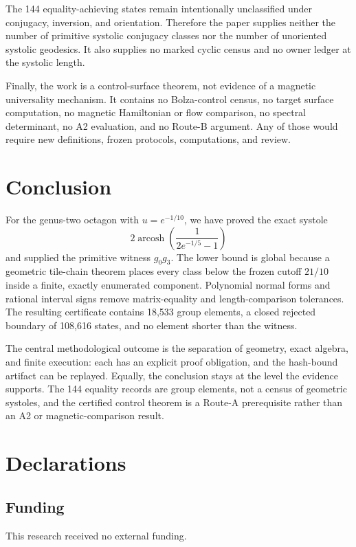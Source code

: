 \documentclass[11pt,a4paper]{article}
\theoremstyle{definition}
\newcommand{\arcosh}{\operatorname{arcosh}}
\begin{document}
The 144 equality-achieving states remain intentionally unclassified under
conjugacy, inversion, and orientation.  Therefore the paper supplies neither
the number of primitive systolic conjugacy classes nor the number of
unoriented systolic geodesics.  It also supplies no marked cyclic census and
no owner ledger at the systolic length.

Finally, the work is a control-surface theorem, not evidence of a magnetic
universality mechanism.  It contains no Bolza-control census, no target
surface computation, no magnetic Hamiltonian or flow comparison, no spectral
determinant, no A2 evaluation, and no Route-B argument.  Any of those would
require new definitions, frozen protocols, computations, and review.

\section{Conclusion}

For the genus-two octagon with \(u=e^{-1/10}\), we have proved the exact
systole
\[
 2\arcosh\!\left(\frac{1}{2e^{-1/5}-1}\right)
\]
and supplied the primitive witness \(g_0g_3\).  The lower bound is global
because a geometric tile-chain theorem places every class below the frozen
cutoff \(21/10\) inside a finite, exactly enumerated component.  Polynomial
normal forms and rational interval signs remove matrix-equality and
length-comparison tolerances.  The resulting certificate contains 18,533
group elements, a closed rejected boundary of 108,616 states, and no element
shorter than the witness.

The central methodological outcome is the separation of geometry, exact
algebra, and finite execution: each has an explicit proof obligation, and the
hash-bound artifact can be replayed.  Equally, the conclusion stays at the
level the evidence supports.  The 144 equality records are group elements,
not a census of geometric systoles, and the certified control theorem is a
Route-A prerequisite rather than an A2 or magnetic-comparison result.

\section*{Declarations}

\subsection*{Funding}
This research received no external funding.
\end{document}
